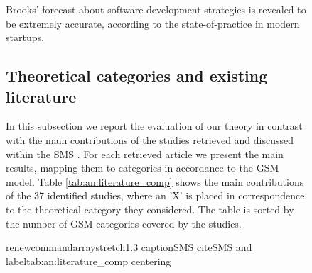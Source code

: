 \documentclass[12pt,journal,compsoc]{../sty/IEEEtran}
\begin{document}
\begin{table}[!t]
\begin{figure}[!t]
\begin{compactitem}
Brooks' forecast about software development strategies is revealed to be
extremely accurate, according to the state-of-practice in modern startups.
\subsection{Theoretical categories and existing literature}
\label{sect:theory:validation:sms}

In this subsection we report the evaluation of our theory in contrast with the
main contributions of the studies retrieved and discussed within the SMS
\cite{SMS}. For each retrieved article we present the main results, mapping them
to categories in accordance to the GSM model. Table \ref{tab:an:literature_comp}
shows the main contributions of the 37 identified studies, where an 'X' is
placed in correspondence to the theoretical category they considered. The table
is sorted by the number of GSM categories covered by the studies.

\begin{table}[!t] renewcommand{arraystretch}{1.3} caption{SMS cite{SMS} and
\GSM}  label{tab:an:literature_comp} centering
\begin{tabular}{|l||c||c||c||c||c||c||c||c||c|}


\end{tabular}
\end{table}
\end{compactitem}
\end{figure}
\end{table}
\end{document}
